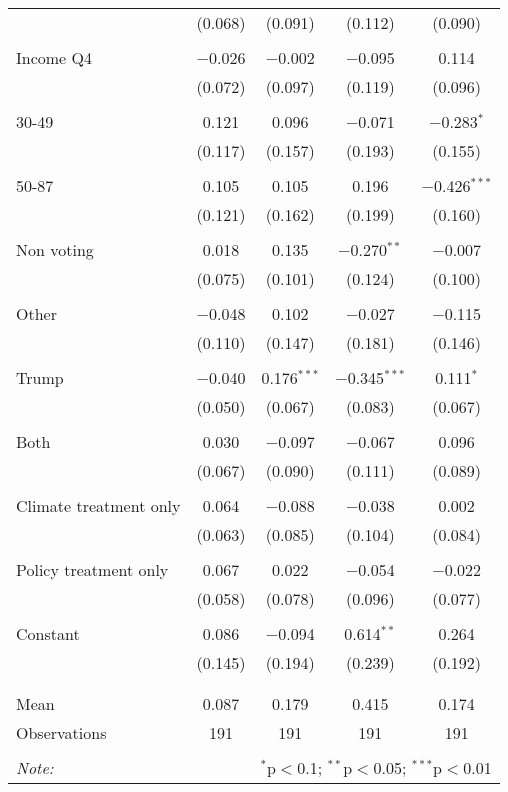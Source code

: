 \begin{tabular}{@{\extracolsep{5pt}}lcccc}
  & (0.068) & (0.091) & (0.112) & (0.090) \\ 
  & & & & \\ 
 Income Q4 & $-$0.026 & $-$0.002 & $-$0.095 & 0.114 \\ 
  & (0.072) & (0.097) & (0.119) & (0.096) \\ 
  & & & & \\ 
 30-49 & 0.121 & 0.096 & $-$0.071 & $-$0.283$^{*}$ \\ 
  & (0.117) & (0.157) & (0.193) & (0.155) \\ 
  & & & & \\ 
 50-87 & 0.105 & 0.105 & 0.196 & $-$0.426$^{***}$ \\ 
  & (0.121) & (0.162) & (0.199) & (0.160) \\ 
  & & & & \\ 
 Non voting & 0.018 & 0.135 & $-$0.270$^{**}$ & $-$0.007 \\ 
  & (0.075) & (0.101) & (0.124) & (0.100) \\ 
  & & & & \\ 
 Other & $-$0.048 & 0.102 & $-$0.027 & $-$0.115 \\ 
  & (0.110) & (0.147) & (0.181) & (0.146) \\ 
  & & & & \\ 
 Trump & $-$0.040 & 0.176$^{***}$ & $-$0.345$^{***}$ & 0.111$^{*}$ \\ 
  & (0.050) & (0.067) & (0.083) & (0.067) \\ 
  & & & & \\ 
 Both & 0.030 & $-$0.097 & $-$0.067 & 0.096 \\ 
  & (0.067) & (0.090) & (0.111) & (0.089) \\ 
  & & & & \\ 
 Climate treatment only & 0.064 & $-$0.088 & $-$0.038 & 0.002 \\ 
  & (0.063) & (0.085) & (0.104) & (0.084) \\ 
  & & & & \\ 
 Policy treatment only & 0.067 & 0.022 & $-$0.054 & $-$0.022 \\ 
  & (0.058) & (0.078) & (0.096) & (0.077) \\ 
  & & & & \\ 
 Constant & 0.086 & $-$0.094 & 0.614$^{**}$ & 0.264 \\ 
  & (0.145) & (0.194) & (0.239) & (0.192) \\ 
  & & & & \\ 
\hline \\[-1.8ex] 
Mean & 0.087 & 0.179 & 0.415 & 0.174 \\ 
Observations & 191 & 191 & 191 & 191 \\ 
\hline 
\hline \\[-1.8ex] 
\textit{Note:}  & \multicolumn{4}{r}{$^{*}$p$<$0.1; $^{**}$p$<$0.05; $^{***}$p$<$0.01} \\ 
\end{tabular} 
